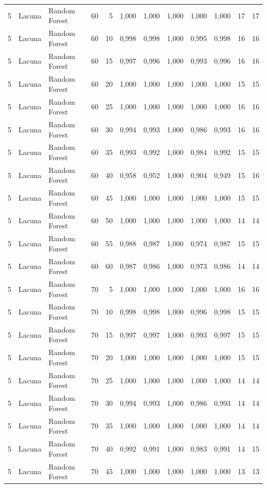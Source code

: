 \begin{longtable}{@{}rllrrrrrrrrr@{}}
5 & Lacuna & Random Forest & 60 & 5 & 1,000 & 1,000 & 1,000 & 1,000 & 1,000 & 17 & 17 \\
5 & Lacuna & Random Forest & 60 & 10 & 0,998 & 0,998 & 1,000 & 0,995 & 0,998 & 16 & 16 \\
5 & Lacuna & Random Forest & 60 & 15 & 0,997 & 0,996 & 1,000 & 0,993 & 0,996 & 16 & 16 \\
5 & Lacuna & Random Forest & 60 & 20 & 1,000 & 1,000 & 1,000 & 1,000 & 1,000 & 15 & 15 \\
5 & Lacuna & Random Forest & 60 & 25 & 1,000 & 1,000 & 1,000 & 1,000 & 1,000 & 16 & 16 \\
5 & Lacuna & Random Forest & 60 & 30 & 0,994 & 0,993 & 1,000 & 0,986 & 0,993 & 16 & 16 \\
5 & Lacuna & Random Forest & 60 & 35 & 0,993 & 0,992 & 1,000 & 0,984 & 0,992 & 15 & 15 \\
5 & Lacuna & Random Forest & 60 & 40 & 0,958 & 0,952 & 1,000 & 0,904 & 0,949 & 15 & 16 \\
5 & Lacuna & Random Forest & 60 & 45 & 1,000 & 1,000 & 1,000 & 1,000 & 1,000 & 15 & 15 \\
5 & Lacuna & Random Forest & 60 & 50 & 1,000 & 1,000 & 1,000 & 1,000 & 1,000 & 14 & 14 \\
5 & Lacuna & Random Forest & 60 & 55 & 0,988 & 0,987 & 1,000 & 0,974 & 0,987 & 15 & 15 \\
5 & Lacuna & Random Forest & 60 & 60 & 0,987 & 0,986 & 1,000 & 0,973 & 0,986 & 14 & 14 \\
5 & Lacuna & Random Forest & 70 & 5 & 1,000 & 1,000 & 1,000 & 1,000 & 1,000 & 16 & 16 \\
5 & Lacuna & Random Forest & 70 & 10 & 0,998 & 0,998 & 1,000 & 0,996 & 0,998 & 15 & 15 \\
5 & Lacuna & Random Forest & 70 & 15 & 0,997 & 0,997 & 1,000 & 0,993 & 0,997 & 15 & 15 \\
5 & Lacuna & Random Forest & 70 & 20 & 1,000 & 1,000 & 1,000 & 1,000 & 1,000 & 15 & 15 \\
5 & Lacuna & Random Forest & 70 & 25 & 1,000 & 1,000 & 1,000 & 1,000 & 1,000 & 14 & 14 \\
5 & Lacuna & Random Forest & 70 & 30 & 0,994 & 0,993 & 1,000 & 0,986 & 0,993 & 14 & 14 \\
5 & Lacuna & Random Forest & 70 & 35 & 1,000 & 1,000 & 1,000 & 1,000 & 1,000 & 14 & 14 \\
5 & Lacuna & Random Forest & 70 & 40 & 0,992 & 0,991 & 1,000 & 0,983 & 0,991 & 14 & 15 \\
5 & Lacuna & Random Forest & 70 & 45 & 1,000 & 1,000 & 1,000 & 1,000 & 1,000 & 13 & 13 \\

\end{longtable}
